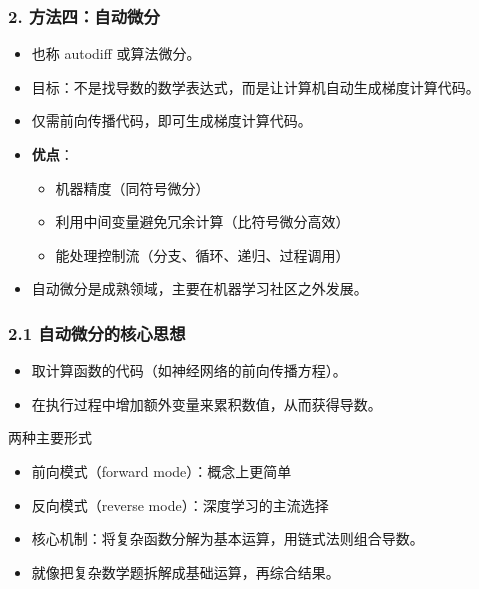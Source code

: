 \documentclass[t,aspectratio=169]{beamer} %
\begin{document}
\begin{frame}
    \frametitle{2. 方法四：自动微分}
    \begin{itemize}
        \item 也称 autodiff 或\alert{算法微分}。
        \item 目标：\alert{不是}找导数的数学表达式，而是让计算机\alert{自动生成梯度计算代码}。
        \item 仅需前向传播代码，即可生成梯度计算代码。
        \item \textbf{优点}：
        \begin{itemize}
            \item 机器精度（同符号微分）
            \item 利用\alert{中间变量}避免冗余计算（比符号微分高效）
            \item 能处理\alert{控制流}（分支、循环、递归、过程调用）
        \end{itemize}
        \item 自动微分是成熟领域，主要在\alert{机器学习社区之外}发展。
    \end{itemize}
\end{frame}

\begin{frame}
    \frametitle{2.1 自动微分的核心思想}
    \begin{itemize}
        \item 取计算函数的代码（如神经网络的前向传播方程）。
        \item 在执行过程中\alert{增加额外变量}来累积数值，从而获得导数。
    \end{itemize}
    \begin{block}{两种主要形式}
        \begin{itemize}
            \item \alert{前向模式}（forward mode）：概念上更简单
            \item \alert{反向模式}（reverse mode）：深度学习的主流选择
        \end{itemize}
    \end{block}
    \begin{itemize}
        \item 核心机制：将复杂函数分解为\alert{基本运算}，用链式法则组合导数。
        \item 就像把复杂数学题拆解成基础运算，再综合结果。
    \end{itemize}
\end{frame}
\end{document}
